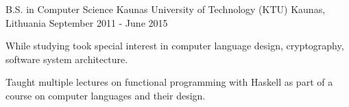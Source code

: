 

\begin{cventries}

  \cventry
    {B.S. in Computer Science} %
    {Kaunas University of Technology (KTU)} %
    {Kaunas, Lithuania} %
    {September 2011 - June 2015} %
    {
      \begin{cvitems} %
        \item {While studying took special interest in computer language design, cryptography, software system architecture.}
        \item {Taught multiple lectures on functional programming with Haskell as part of a course on computer languages and their design.}
      \end{cvitems}
    }

\end{cventries}
